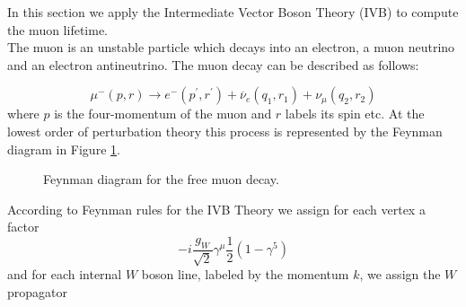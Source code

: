 In this section we apply the Intermediate Vector Boson Theory (IVB) to compute the muon lifetime.\\

The muon is an unstable particle which decays into an electron, a muon neutrino and an electron antineutrino. The muon decay can be described as follows:

\begin{equation} \label{16.39}
\mu^{-} (p,r) \rightarrow e^{-} (p^', r^') + \overline \nu_{e} (q_1, r_1) + \nu_{\mu} (q_2, r_2)
\end{equation}
where $p$ is the four-momentum of the muon and $r$ labels its spin etc. 
At the lowest order of perturbation theory this process is represented by the Feynman diagram in Figure \ref{feynmandiagram}.\\
\begin{figure}[!h]
	\centering	
	
	
	\caption{Feynman diagram for the free muon decay.}\label{feynmandiagram}
\end{figure}

\noindent According to Feynman rules for the IVB Theory we assign for each vertex a factor 
\begin{equation}
-i \frac{g_{W}}{\sqrt 2} \gamma^{\mu} \frac{1}{2} (1 - \gamma^5)
\end{equation} 
and for each internal $W$ boson line, labeled by the momentum $k$, we assign the $W$ propagator

